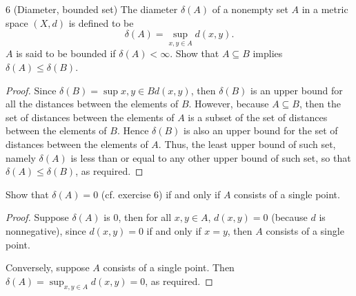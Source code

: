 \begin{exercise}{6 (Diameter, bounded set)}
The diameter $\delta(A)$ of a nonempty set $A$ in a metric space $(X,d)$ is defined to be 
\[
\delta(A) =\sup_{x,y\in A}d(x,y).
\]
$A$ is said to be bounded if $\delta(A)<\infty$. Show that $A\subseteq B$ implies $\delta(A)\leq\delta(B)$.
\end{exercise}
\begin{proof}
Since $\delta(B)=\sup{x,y\in B}d(x,y)$, then $\delta(B)$ is an upper bound for all the distances between the elements of $B$. However, because $A\subseteq B$, then the set of distances between the elements of $A$ is a subset of the set of distances between the elements of $B$. Hence $\delta(B)$ is also an upper bound for the set of distances between the elements of $A$. Thus, the least upper bound of such set, namely $\delta(A)$ is less than or equal to any other upper bound of such set, so that $\delta(A)\leq\delta(B)$, as required.
\end{proof}

\begin{exercise}{7}
Show that $\delta(A)=0$ (cf. exercise 6) if and only if $A$ consists of a single point.
\end{exercise}
\begin{proof}
Suppose $\delta(A)$ is 0, then for all $x,y\in A$, $d(x,y)=0$ (because $d$ is nonnegative), since $d(x,y)=0$ if and only if $x=y$, then $A$ consists of a single point. 

Conversely, suppose $A$ consists of a single point. Then $\delta(A) = \sup_{x,y\in A}d(x,y) =0$, as required.
\end{proof}

